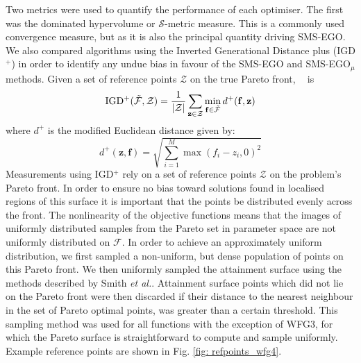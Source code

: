 \documentclass[conference]{IEEEtran}
\makeatletter
\DeclarePairedDelimiter\abs{\lvert}{\rvert}%
\newcommand{\nobj}{M}
\DeclareMathOperator*{\igdp}{IGD^{+}}
\newcommand\hpv{dominated hypervolume\xspace}
\newcommand\smsego{SMS-EGO\xspace}
\newcommand\smsegomu{SMS-EGO$_{\mu}$\xspace}
\newcommand\igd{IGD$^+$\xspace}
\newcommand\mF{\mathcal{F}}
\newcommand\Fapprox{\tilde{\mathcal{F}}}
\newcommand{\pigdref}{\mathcal{Z}}
\newcommand{\bff}{\mathbf{f}}
\newcommand*{\etal}{\textit{et al.}\@\xspace}
\makeatother
\begin{document}
Two metrics were used to quantify the performance of each optimiser. The first was the \hpv or $\mathcal{S}$-metric measure. This is a commonly used convergence measure, but as it is also the principal quantity driving \smsego. We also compared algorithms using the   Inverted Generational Distance plus (\igd) \cite{ishibuchi2015modified} in order to identify any undue bias in favour of the \smsego and \smsegomu methods. Given a set of reference points $\pigdref$ on the true Pareto front, $\igdp$ is
\begin{equation}
    \igdp(\Fapprox, \pigdref) = \frac{1}{\abs{\pigdref}}
    \sum_{\mathbf{z}\in\pigdref} \min_{\bff \in \Fapprox} d^{+}(\bff, \mathbf{z})
\end{equation}
where $d^{+}$ is the modified Euclidean distance given by:
\begin{equation}
    d^+(\mathbf{z}, \mathbf{f}) = \sqrt{\sum^{\nobj}_{i=1}\max(f_i - z_i, 0)^2}
\end{equation}
Measurements using \igd rely on a set of reference points $\pigdref$ on the problem's Pareto front. In order to ensure no bias toward solutions found in localised regions of this surface it is important that the points be distributed evenly across the front. The nonlinearity of the objective functions means that the images of  uniformly distributed samples from the Pareto set in parameter space are not uniformly distributed on $\mF$.  In order to achieve an approximately uniform distribution, we first sampled a non-uniform, but dense population of points on this Pareto front.  We then uniformly sampled the attainment surface  using the methods described by Smith \etal \cite{smith2004dominance}. Attainment surface points which did not lie on the Pareto front were then discarded if their distance to the nearest neighbour in the set of Pareto optimal points, was greater than a certain threshold. This sampling method was used for all functions with the exception of WFG3, for which the Pareto surface is straightforward to compute and sample uniformly. Example reference points are shown in Fig. \ref{fig: refpoints_wfg4}.  
\end{document}
